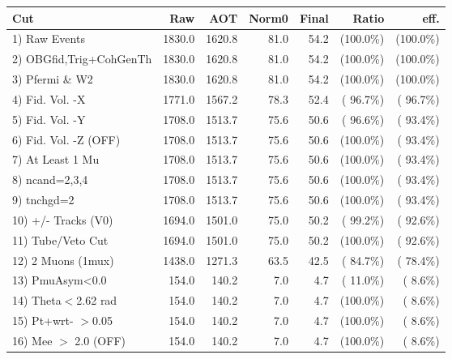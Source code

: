  \begin{table}[h!]\centering
 \begin{tabular}{||l||r|r|r|r|r|r||}
 \hline
 \hline
 Cut & Raw & AOT & Norm0 & Final & Ratio & eff.       \\
 \hline
  1) Raw Events           &       1830.0 &       1620.8 &         81.0 &         54.2 & (100.0\%) & (100.0\%) \\
  2) OBGfid,Trig+CohGenTh &       1830.0 &       1620.8 &         81.0 &         54.2 & (100.0\%) & (100.0\%) \\
  3) Pfermi \& W2         &       1830.0 &       1620.8 &         81.0 &         54.2 & (100.0\%) & (100.0\%) \\
  4) Fid. Vol. -X         &       1771.0 &       1567.2 &         78.3 &         52.4 & ( 96.7\%) & ( 96.7\%) \\
  5) Fid. Vol. -Y         &       1708.0 &       1513.7 &         75.6 &         50.6 & ( 96.6\%) & ( 93.4\%) \\
  6) Fid. Vol. -Z (OFF)   &       1708.0 &       1513.7 &         75.6 &         50.6 & (100.0\%) & ( 93.4\%) \\
  7) At Least 1 Mu        &       1708.0 &       1513.7 &         75.6 &         50.6 & (100.0\%) & ( 93.4\%) \\
  8) ncand=2,3,4          &       1708.0 &       1513.7 &         75.6 &         50.6 & (100.0\%) & ( 93.4\%) \\
  9) tnchgd=2             &       1708.0 &       1513.7 &         75.6 &         50.6 & (100.0\%) & ( 93.4\%) \\
 10) +/- Tracks (V0)      &       1694.0 &       1501.0 &         75.0 &         50.2 & ( 99.2\%) & ( 92.6\%) \\
 11) Tube/Veto Cut        &       1694.0 &       1501.0 &         75.0 &         50.2 & (100.0\%) & ( 92.6\%) \\
 12) 2 Muons (1mux)       &       1438.0 &       1271.3 &         63.5 &         42.5 & ( 84.7\%) & ( 78.4\%) \\
 13) PmuAsym<0.0          &        154.0 &        140.2 &          7.0 &          4.7 & ( 11.0\%) & (  8.6\%) \\
 14) Theta$<$2.62 rad     &        154.0 &        140.2 &          7.0 &          4.7 & (100.0\%) & (  8.6\%) \\
 15) Pt+wrt- $>$0.05      &        154.0 &        140.2 &          7.0 &          4.7 & (100.0\%) & (  8.6\%) \\
 16) Mee $>$ 2.0  (OFF)   &        154.0 &        140.2 &          7.0 &          4.7 & (100.0\%) & (  8.6\%) \\

\end{tabular}
\end{table}
